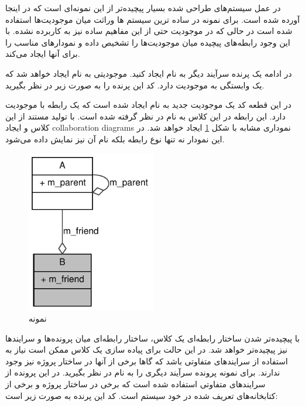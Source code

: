 در عمل سیستم‌های طراحی شده بسیار پیچیده‌تر از این نمونه‌ای است که در اینجا آورده
شده است. برای نمونه در ساده ترین سیستم ها وراثت میان موجودیت‌ها استفاده شده است
در حالی که در موجودیت  حتی از این مفاهیم ساده نیز به کاربرده نشده. با این
وجود  رابطه‌های پیچیده میان موجودیت‌ها را تشخیص داده و نمودارهای
مناسب را برای آنها ایجاد می‌کند.

در ادامه یک پرنده سرآیند دیگر به نام  ایجاد کنید. موجودیتی به
نام  ایجاد خواهد شد که یک وابستگی به موجودیت  دارد. کد این پرنده را
به صورت زیر در نظر بگیرید.


در این قطعه کد یک موجودیت جدید به نام  ایجاد شده است که یک رابطه با
موجودیت  دارد. این رابطه در این کلاس به نام  در نظر گرفته
شده است. با تولید مستند از این کلاس و ایجاد \glspl{collaboration diagram}
نموداری مشابه با شکل \ref{image/write/graph/example/class_b__coll__graph} ایجاد
خواهد شد. در این نمودار نه تنها نوع رابطه بلکه نام آن نیز نمایش داده می‌شود.

\begin{figure}
	\centering
	\includegraphics[width=0.5\textwidth]{image/write/graph/example/class_b__coll__graph}
	\caption[نمونه]{
		نمونه
	}
	\label{image/write/graph/example/class_b__coll__graph}
\end{figure}

با پیچیده‌تر شدن ساختار رابطه‌ای یک کلاس، ساختار رابطه‌ای میان پرونده‌ها و
سرایندها نیز پیچیده‌تر خواهد شد. در این حالت برای پیاده سازی یک کلاس ممکن است
نیاز به استفاده از سرایندهای متفاوتی باشد که گاها برخی از آنها در ساختار پروژه
نیز وجود ندارند.
برای نمونه پرونده سرآیند دیگری را به نام  در نظر بگیرید. در این
پرونده از سرایندهای متفاوتی استفاده شده است که برخی در ساختار پروژه و برخی از
کتابخانه‌های تعریف شده در خود سیستم است. کد این پرنده به صورت زیر است:

